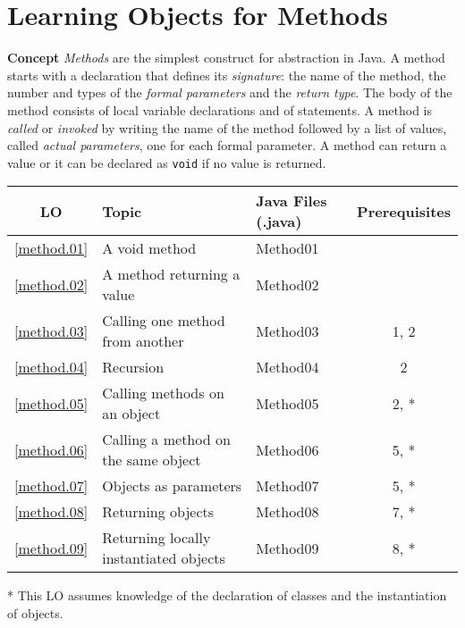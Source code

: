 \section{Learning Objects for Methods}\label{s.method}

\textbf{Concept} \emph{Methods} are the simplest construct for abstraction
in Java. A method starts with a declaration that defines its \emph{signature}:
the name of the method, the number and types of the \emph{formal parameters} 
and the \emph{return type}.
The body of the method consists of local variable declarations and of statements.
A method is \emph{called} or \emph{invoked} by writing the name of the method
followed by a list of values, called \emph{actual parameters}, one for
each formal parameter. A method can return a value or it can be declared
as \texttt{void} if no value is returned.

\begin{center}
\begin{tabular}{|c|l|l|c|}
\hline
LO & Topic  & Java Files (.java) & Prerequisites \\\hline
\ref{method.01} &  A void method          & Method01 &\\\hline
\ref{method.02} &  A method returning a value & Method02 &\\\hline
\ref{method.03} &  Calling one method from another & Method03 &1, 2\\\hline
\ref{method.04} &  Recursion & Method04 &2\\\hline
\ref{method.05} &  Calling methods on an object & Method05 &2, *\\\hline
\ref{method.06} &  Calling a method on the same object & Method06 &5, *\\\hline
\ref{method.07} &  Objects as parameters & Method07 &5, *\\\hline
\ref{method.08} &  Returning objects & Method08 &7, *\\\hline
\ref{method.09} &  Returning locally instantiated objects & Method09 &8, *\\\hline
\end{tabular}
\end{center}
* This LO assumes knowledge of the declaration of
classes and the instantiation of objects.










